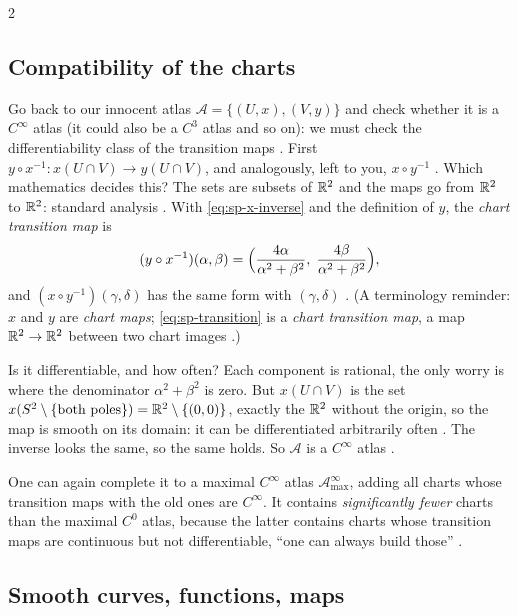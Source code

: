 \begin{paracol}{2}
\subsection{Compatibility of the charts}

Go back to our innocent atlas $\mathcal A=\{(U,x),(V,y)\}$ and check whether it is a $C^\infty$ atlas (it could also be a $C^3$ atlas and so on):
we must check the differentiability class of the transition maps . First
$y\circ x^{-1}\colon x(U\cap V)\to y(U\cap V)$, and analogously, left to you, $x\circ y^{-1}$ .
Which mathematics decides this? The sets are subsets of $\mathbb{R}^2$ and the maps go from $\mathbb{R}^2$ to $\mathbb{R}^2$: standard analysis .
With \eqref{eq:sp-x-inverse} and the definition of $y$, the \emph{chart transition map} is
\begin{equation}\label{eq:sp-transition}
  (y\circ x^{-1})(\alpha,\beta)=\Bigl(\frac{4\alpha}{\alpha^2+\beta^2},\;\frac{4\beta}{\alpha^2+\beta^2}\Bigr),
\end{equation}
and $(x\circ y^{-1})(\gamma,\delta)$ has the same form with $(\gamma,\delta)$ .
(A terminology reminder: $x$ and $y$ are \emph{chart maps}; \eqref{eq:sp-transition} is a \emph{chart transition map}, a map $\mathbb{R}^2\to\mathbb{R}^2$ between
two chart images .)

Is it differentiable, and how often? Each component is rational, the only worry is where the denominator
$\alpha^2+\beta^2$ is zero. But $x(U\cap V)$ is the set $x(S^2\setminus\{\text{both poles}\})=\mathbb{R}^2\setminus\{(0,0)\}$, exactly the $\mathbb{R}^2$ without
the origin, so the map is smooth on its domain: it can be differentiated arbitrarily often . The inverse looks the same,
so the same holds. So $\mathcal A$ is a $C^\infty$ atlas .

One can again complete it to a maximal $C^\infty$ atlas $\mathcal A_{\max}^{\infty}$, adding all charts whose transition maps with the old ones are $C^\infty$.
It contains \emph{significantly fewer} charts than the maximal $C^0$ atlas, because the latter contains charts whose transition
maps are continuous but not differentiable, ``one can always build those'' .

\subsection{Smooth curves, functions, maps}


\end{paracol}
